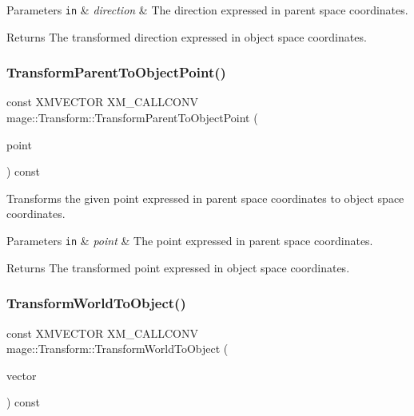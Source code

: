 \begin{DoxyParams}[1]{Parameters}
\mbox{\tt in}  & {\em direction} & The direction expressed in parent space coordinates. \\
\hline
\end{DoxyParams}
\begin{DoxyReturn}{Returns}
The transformed direction expressed in object space coordinates. 
\end{DoxyReturn}
\hypertarget{classmage_1_1_transform_a4b420feb6f839d045a0239056b47772d}{}\label{classmage_1_1_transform_a4b420feb6f839d045a0239056b47772d} 
\subsubsection{\texorpdfstring{Transform\+Parent\+To\+Object\+Point()}{TransformParentToObjectPoint()}}
{\footnotesize\ttfamily const X\+M\+V\+E\+C\+T\+OR X\+M\+\_\+\+C\+A\+L\+L\+C\+O\+NV mage\+::\+Transform\+::\+Transform\+Parent\+To\+Object\+Point (\begin{DoxyParamCaption}\item[{F\+X\+M\+V\+E\+C\+T\+OR}]{point }\end{DoxyParamCaption}) const\hspace{0.3cm}{\ttfamily [noexcept]}}

Transforms the given point expressed in parent space coordinates to object space coordinates.


\begin{DoxyParams}[1]{Parameters}
\mbox{\tt in}  & {\em point} & The point expressed in parent space coordinates. \\
\hline
\end{DoxyParams}
\begin{DoxyReturn}{Returns}
The transformed point expressed in object space coordinates. 
\end{DoxyReturn}
\hypertarget{classmage_1_1_transform_adc0ce8b6fa55d289b5354d21b3e96486}{}\label{classmage_1_1_transform_adc0ce8b6fa55d289b5354d21b3e96486} 
\subsubsection{\texorpdfstring{Transform\+World\+To\+Object()}{TransformWorldToObject()}}
{\footnotesize\ttfamily const X\+M\+V\+E\+C\+T\+OR X\+M\+\_\+\+C\+A\+L\+L\+C\+O\+NV mage\+::\+Transform\+::\+Transform\+World\+To\+Object (\begin{DoxyParamCaption}\item[{F\+X\+M\+V\+E\+C\+T\+OR}]{vector }\end{DoxyParamCaption}) const\hspace{0.3cm}{\ttfamily [noexcept]}}

